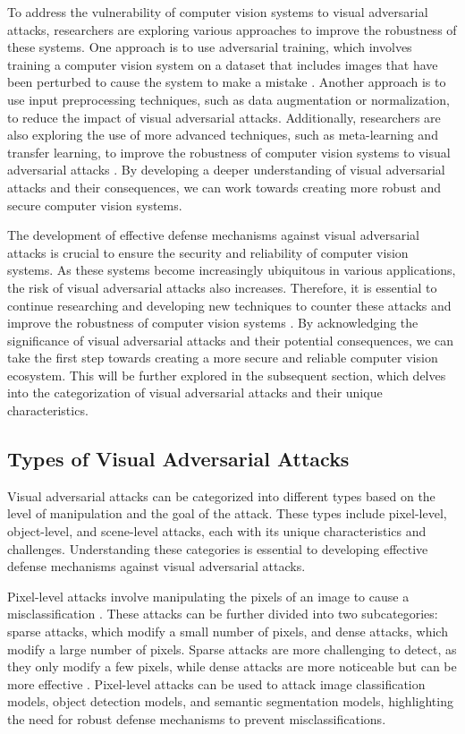 \documentclass[11pt]{article}
\begin{document}
To address the vulnerability of computer vision systems to visual adversarial attacks, researchers are exploring various approaches to improve the robustness of these systems. One approach is to use adversarial training, which involves training a computer vision system on a dataset that includes images that have been perturbed to cause the system to make a mistake \cite{ref5}. Another approach is to use input preprocessing techniques, such as data augmentation or normalization, to reduce the impact of visual adversarial attacks. Additionally, researchers are also exploring the use of more advanced techniques, such as meta-learning and transfer learning, to improve the robustness of computer vision systems to visual adversarial attacks \cite{ref6}. By developing a deeper understanding of visual adversarial attacks and their consequences, we can work towards creating more robust and secure computer vision systems.

The development of effective defense mechanisms against visual adversarial attacks is crucial to ensure the security and reliability of computer vision systems. As these systems become increasingly ubiquitous in various applications, the risk of visual adversarial attacks also increases. Therefore, it is essential to continue researching and developing new techniques to counter these attacks and improve the robustness of computer vision systems \cite{ref7}. By acknowledging the significance of visual adversarial attacks and their potential consequences, we can take the first step towards creating a more secure and reliable computer vision ecosystem. This will be further explored in the subsequent section, which delves into the categorization of visual adversarial attacks and their unique characteristics.

\subsection{Types of Visual Adversarial Attacks}

Visual adversarial attacks can be categorized into different types based on the level of manipulation and the goal of the attack. These types include pixel-level, object-level, and scene-level attacks, each with its unique characteristics and challenges. Understanding these categories is essential to developing effective defense mechanisms against visual adversarial attacks.

Pixel-level attacks involve manipulating the pixels of an image to cause a misclassification \cite{ref8}. These attacks can be further divided into two subcategories: sparse attacks, which modify a small number of pixels, and dense attacks, which modify a large number of pixels. Sparse attacks are more challenging to detect, as they only modify a few pixels, while dense attacks are more noticeable but can be more effective \cite{ref9}. Pixel-level attacks can be used to attack image classification models, object detection models, and semantic segmentation models, highlighting the need for robust defense mechanisms to prevent misclassifications.
\end{document}
